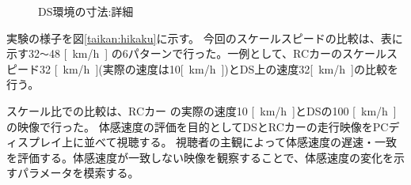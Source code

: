 \begin{figure}[h]
  \begin{center}
  \caption{DS環境の寸法:詳細}
  \label{taikan:dsm2}
  \end{center}
\end{figure}

実験の様子を図\ref{taikan:hikaku}に示す。
今回のスケールスピードの比較は、表に示す32\verb|～|48 \si{[km/h]}
の6パターンで行った。一例として、RCカーのスケールスピード32 \si{[km/h]}(実際の速度は10\si{[km/h]})とDS上の速度32\si{[km/h]}の比較を行う。

スケール比での比較は、RCカー の実際の速度10 \si{[km/h]}とDSの100 \si{[km/h]}の映像で行った。
体感速度の評価を目的としてDSとRCカーの走行映像をPCディスプレイ上に並べて視聴する。
視聴者の主観によって体感速度の遅速・一致を評価する。体感速度が一致しない映像を観察することで、体感速度の変化を示すパラメータを模索する。

